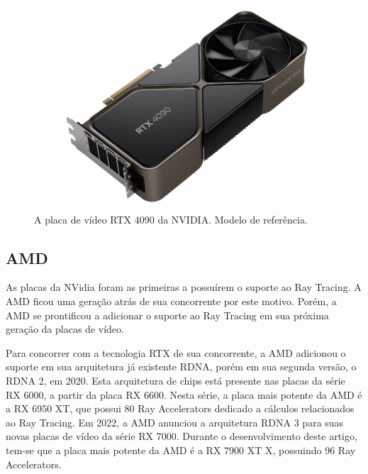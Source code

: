 \documentclass[journal]{IEEEtran}
\begin{document}
\begin{figure}[ht]
  \centering
  \includegraphics[width=\linewidth]{media/rtx4090.jpg}
  \caption{A placa de vídeo RTX 4090 da NVIDIA. Modelo de referência.}
  \label{img_rtx4090}
\end{figure}


\subsection{AMD}
As placas da NVidia foram as primeiras a possuírem o suporte ao Ray Tracing. A AMD
ficou uma geração atrás de sua concorrente por este motivo. Porém, a AMD se prontificou
a adicionar o suporte ao Ray Tracing em sua próxima geração da placas de vídeo.

Para concorrer com a tecnologia RTX de sua concorrente, a AMD adicionou o suporte em sua
arquitetura já existente RDNA, porém em sua segunda versão, o RDNA 2, em 2020. Esta arquitetura 
de chips está presente nas placas da série RX 6000, a partir da placa RX 6600. Nesta série,
a placa mais potente da AMD é a RX 6950 XT, que possui 80 Ray Accelerators dedicado a
cálculos relacionados ao Ray Tracing. Em 2022, a AMD anunciou a arquitetura RDNA 3 para
suas novas placas de vídeo da série RX 7000. Durante o desenvolvimento deste artigo,
tem-se que a placa mais potente da AMD é a RX 7900 XT X, possuindo 96 Ray Accelerators.
\end{document}
